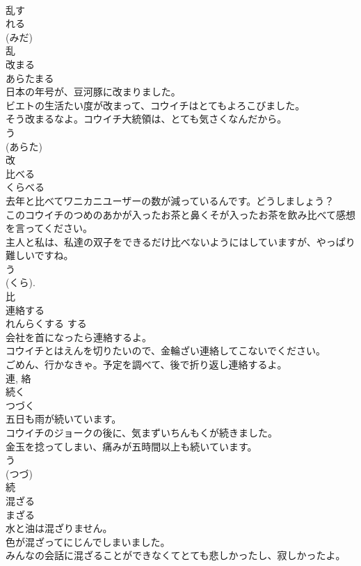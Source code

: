 \documentclass[8pt]{extreport}
\begin{document}
\begin{CJK}{UTF8}{min}
\\	乱す 
\\	れる 
\\	(みだ) 
\\	乱	
\\	改まる	
\\	あらたまる	
\\	日本の年号が、豆河豚に改まりました。	
\\	ビエトの生活たい度が改まって、コウイチはとてもよろこびました。	
\\	そう改まるなよ。コウイチ大統領は、とても気さくなんだから。	
\\	う 
\\	(あらた) 
\\	改	
\\	比べる	
\\	くらべる	
\\	去年と比べてワニカニユーザーの数が減っているんです。どうしましょう？	
\\	このコウイチのつめのあかが入ったお茶と鼻くそが入ったお茶を飲み比べて感想を言ってください。	
\\	主人と私は、私達の双子をできるだけ比べないようにはしていますが、やっぱり難しいですね。	
\\	う 
\\	(くら). 
\\	比	
\\	連絡する	
\\	れんらくする	する 
\\	会社を首になったら連絡するよ。	
\\	コウイチとはえんを切りたいので、金輪ざい連絡してこないでください。	
\\	ごめん、行かなきゃ。予定を調べて、後で折り返し連絡するよ。	
\\	連, 絡	
\\	続く	
\\	つづく	
\\	五日も雨が続いています。	
\\	コウイチのジョークの後に、気まずいちんもくが続きました。	
\\	金玉を捻ってしまい、痛みが五時間以上も続いています。	
\\	う 
\\	(つづ) 
\\	続	
\\	混ざる	
\\	まざる	
\\	水と油は混ざりません。	
\\	色が混ざってにじんでしまいました。	
\\	みんなの会話に混ざることができなくてとても悲しかったし、寂しかったよ。	

\end{CJK}
\end{document}
